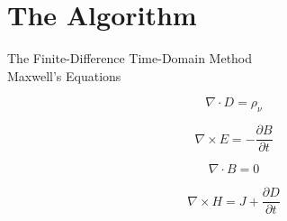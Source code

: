 \section{The Algorithm}

The Finite-Difference Time-Domain Method\\
Maxwell's Equations

\begin{displaymath}
  \nabla \cdot D = \rho_{\nu}
\end{displaymath}


\begin{displaymath}
    \nabla \times E = -\frac{\partial B}{\partial t}
\end{displaymath}


\begin{displaymath}
  \nabla \cdot B = 0
\end{displaymath}


\begin{displaymath}
  \nabla \times H = J + \frac{\partial D}{\partial t}
\end{displaymath}
